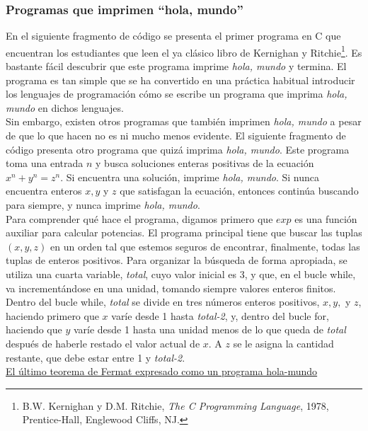 \subsubsection{Programas que imprimen ``hola, mundo''}

En el siguiente fragmento de código se presenta el primer programa en C que encuentran los estudiantes que leen el ya clásico libro de Kernighan y Ritchie\footnote{B.W. Kernighan y D.M. Ritchie, \emph{The C Programming Language}, 1978, Prentice-Hall, Englewood Cliffs, NJ.}. Es bastante fácil descubrir que este programa imprime \emph{hola, mundo} y termina. El programa es tan simple que se ha convertido en una práctica habitual introducir los lenguajes de programación cómo se escribe un programa que imprima \emph{hola, mundo} en dichos lenguajes. \\



Sin embargo, existen otros programas que también imprimen \emph{hola, mundo} a pesar de que lo que hacen no es ni mucho menos evidente. El siguiente fragmento de código presenta otro programa que quizá imprima \emph{hola, mundo}. Este programa toma una entrada $n$ y busca soluciones enteras positivas de la ecuación $x^n + y^n = z^n$. Si encuentra una solución, imprime \emph{hola, mundo}. Si nunca encuentra enteros $x, y$ y $z$ que satisfagan la ecuación, entonces continúa buscando para siempre, y nunca imprime \emph{hola, mundo}.\\

Para comprender qué hace el programa, digamos primero que $exp$ es una función auxiliar para calcular potencias. El programa principal tiene que buscar las tuplas $(x,y,z)$ en un orden tal que estemos seguros de encontrar, finalmente, todas las tuplas de enteros positivos. Para organizar la búsqueda de forma apropiada, se utiliza una cuarta variable, \emph{total}, cuyo valor inicial es 3, y que, en el bucle while, va incrementándose en una unidad, tomando siempre valores enteros finitos. Dentro del bucle while, \emph{total} se divide en tres números enteros positivos, $x, y,$ y $z$, haciendo primero que $x$ varíe desde 1 hasta \emph{total-2}, y, dentro del bucle for, haciendo que $y$ varíe desde 1 hasta una unidad menos de lo que queda de \emph{total} después de haberle restado el valor actual de $x$. A $z$ se le asigna la cantidad restante, que debe estar entre 1 y \emph{total-2}.\\

\underline{El último teorema de Fermat expresado como un programa hola-mundo}


